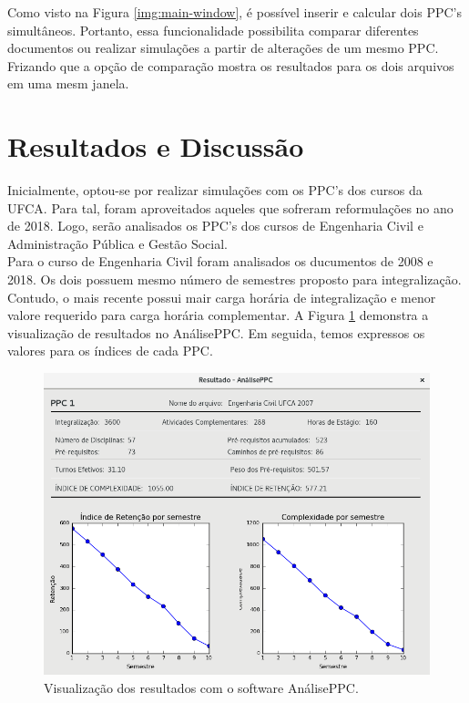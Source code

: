 \documentclass[a4paper, 12pt]{article}
\begin{document}
Como visto na Figura \ref{img:main-window}, é possível inserir e calcular dois PPC's simultâneos. Portanto, essa funcionalidade possibilita comparar diferentes 
documentos ou realizar simulações a partir de alterações de um mesmo PPC. Frizando que a opção de comparação mostra os resultados para os dois arquivos em 
uma mesm janela. \\

\section*{Resultados e Discussão}

Inicialmente, optou-se por realizar simulações com os PPC's dos cursos da UFCA. Para tal, foram aproveitados aqueles que sofreram reformulações no ano de 2018. 
Logo, serão analisados os PPC's dos cursos de Engenharia Civil e Administração 
Pública e Gestão Social. \\

Para o curso de Engenharia Civil foram analisados os ducumentos de 2008 e 2018. Os dois possuem mesmo número de semestres proposto para integralização. Contudo, 
o mais recente possui mair carga horária de integralização e menor valore requerido para carga horária complementar. A Figura \ref{img:civil-window} demonstra a visualização de resultados no AnálisePPC. Em seguida, temos expressos os valores 
para os índices de cada PPC. \\

\begin{figure}[htb!]
\centering
\includegraphics[scale=0.45]{civil-window}
\caption{Visualização dos resultados com o software AnálisePPC.}
\label{img:civil-window}
\end{figure}
\end{document}

